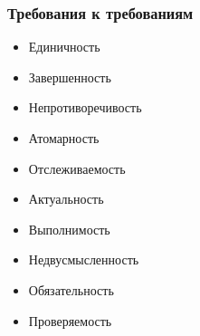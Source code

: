 \documentclass{../../slides-style}
\begin{document}
    \begin{frame}
        \frametitle{Требования к требованиям}
        \begin{itemize}
            \item Единичность
            \item Завершенность
            \item Непротиворечивость
            \item Атомарность
            \item Отслеживаемость
            \item Актуальность
            \item Выполнимость
            \item Недвусмысленность
            \item Обязательность
            \item Проверяемость
        \end{itemize}
    \end{frame}
\end{document}
